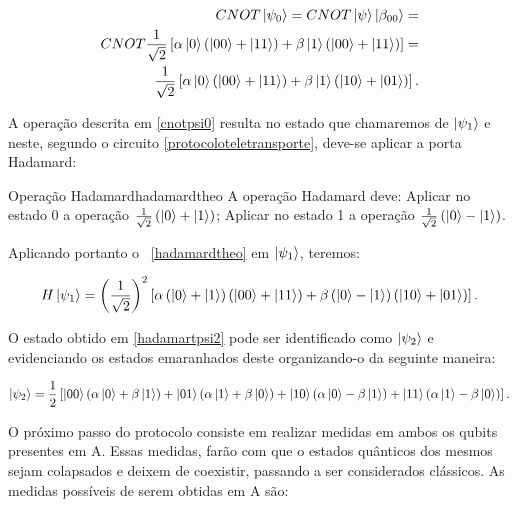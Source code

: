 \begin{eqnarray}\label{cnotpsi0}
CNOT \ket{\psi_0} = CNOT \ket{\psi} \ket{\beta_{00}} = \nonumber \\
CNOT \frac{1}{\sqrt{2}} \left[ \alpha  \ket{0} \left( \ket{00} + \ket{11} \right) + \beta \ket{1} \left( \ket{00} + \ket{11} \right)\right] = \nonumber \\
\frac{1}{\sqrt{2}} \left[\alpha \ket{0} \left( \ket{00} + \ket{11} \right) + \beta \ket{1} \left( \ket{10} + \ket{01} \right) \right].
\end{eqnarray}

A operação descrita em \ref{cnotpsi0} resulta no estado que chamaremos de $\ket{\psi_1}$ e neste, segundo o circuito \ref{protocoloteletransporte}, deve-se aplicar a porta Hadamard:

\begin{theo}{Operação Hadamard}{hadamardtheo}
A operação Hadamard deve: Aplicar no estado 0 a operação $\frac{1}{\sqrt{2}} \left(\ket{0}+\ket{1}\right)$; Aplicar no estado 1 a operação $\frac{1}{\sqrt{2}}\left(\ket{0}-\ket{1}\right)$.
\end{theo}

Aplicando portanto o ~\ref{hadamardtheo} em $\ket{\psi_1}$, teremos:

\begin{equation}\label{hadamartpsi2}
 H \ket{\psi_1} = \left( \frac{1}{\sqrt{2}}\right)^{2} \left[ \alpha \left( \ket{0} + \ket{1} \right)\left( \ket{00} +\ket{11} \right)+ \beta \left( \ket{0} - \ket{1} \right) \left( \ket{10} + \ket{01} \right) \right].
\end{equation}

O estado obtido em \ref{hadamartpsi2} pode ser identificado como $\ket{\psi_2}$ e
evidenciando os estados emaranhados deste organizando-o da seguinte maneira:

\begin{equation}\label{psi2}
 \ket{\psi_2} = \frac{1}{2} \left[ \ket{00} ( \alpha \ket{0} + \beta \ket{1} ) + \ket{01} ( \alpha \ket{1} + \beta \ket{0} ) + \ket{10} ( \alpha \ket{0} - \beta \ket{1} ) + \ket{11} ( \alpha \ket{1} - \beta \ket{0} ) \right].
\end{equation}

O próximo passo do protocolo consiste em realizar medidas em ambos os qubits presentes em A. Essas medidas, farão com que o estados quânticos dos mesmos sejam colapsados e deixem de coexistir, passando a ser considerados clássicos. As medidas possíveis de serem obtidas em A são:


